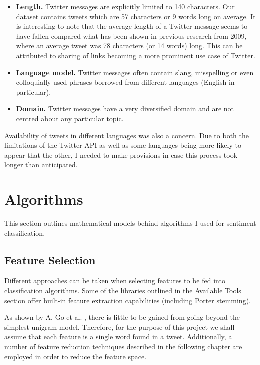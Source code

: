 \begin{itemize}
  \item \textbf{Length.} Twitter messages are explicitly limited to 140 characters. Our dataset contains tweets which are 57 characters or 9 words long on average. It is interesting to note that the average length of a Twitter message seems to have fallen compared what has been shown in previous research \cite{TwitterDistantSupervision09} from 2009, where an average tweet was 78 characters (or 14 words) long. This can be attributed to sharing of links becoming a more prominent use case of Twitter.
  \item \textbf{Language model.} Twitter messages often contain slang, misspelling or even colloquially used phrases borrowed from different languages (English in particular).
  \item \textbf{Domain.} Twitter messages have a very diversified domain and are not centred about any particular topic.
\end{itemize}

Availability of tweets in different languages was also a concern. Due to both the limitations of the Twitter API as well as some languages being more likely to appear that the other, I needed to make provisions in case this process took longer than anticipated.

\section{Algorithms}

This section outlines mathematical models behind algorithms I used for sentiment classification.

\subsection{Feature Selection}

Different approaches can be taken when selecting features to be fed into classification algorithms. Some of the libraries outlined in the Available Tools section offer built-in feature extraction capabilities (including Porter stemming).

As shown by A. Go et al. \cite{TwitterDistantSupervision09}, there is little to be gained from going beyond the simplest unigram model. Therefore, for the purpose of this project we shall assume that each feature is a single word found in a tweet. Additionally, a number of feature reduction techniques described in the following chapter are employed in order to reduce the feature space.

